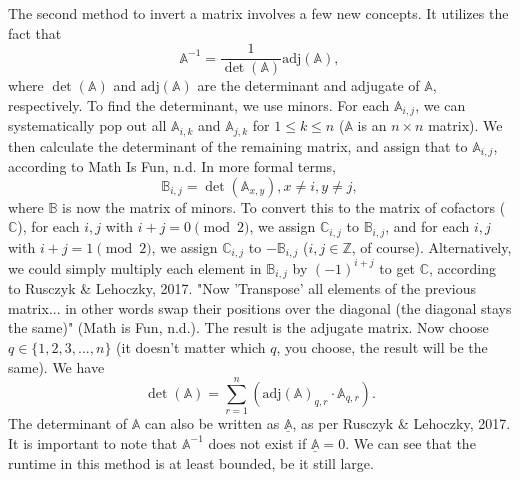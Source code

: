 \documentclass{article}
\begin{document}
\par The second method to invert a matrix involves a few new concepts. It utilizes the fact that 
$$\mathbb{A}^{-1}=\frac{1}{\det(\mathbb{A})}\text{adj}(\mathbb{A}),$$
where $\det(\mathbb{A})$ and $\text{adj}(\mathbb{A})$ are the determinant and adjugate of $\mathbb{A}$, respectively. To find the determinant, we use minors. For each $\mathbb{A}_{i,j}$, we can systematically pop out all $\mathbb{A}_{i,k}$ and $\mathbb{A}_{j,k}$ for $1\le k\le n$ ($\mathbb{A}$ is an $n\times n$ matrix). We then calculate the determinant  of the remaining matrix, and assign that to $\mathbb{A}_{i,j}$, according to Math Is Fun, n.d. In more formal terms,
$$\mathbb{B}_{i,j}=\det(\mathbb{A}_{x,y}), x\ne i, y\ne j,$$
where $\mathbb{B}$ is now the matrix of minors. To convert this to the matrix of cofactors ($\mathbb{C}$), for each $i,j$ with $i+j=0\pmod{2}$, we assign $\mathbb{C}_{i,j}$ to $\mathbb{B}_{i,j}$, and for each $i,j$ with $i+j=1\pmod{2}$, we assign $\mathbb{C}_{i,j}$ to $-\mathbb{B}_{i,j}$ ($i,j\in\mathbb{Z}$, of course). Alternatively, we could simply multiply each element in $\mathbb{B}_{i,j}$ by $(-1)^{i+j}$ to get $\mathbb{C}$, according to Rusczyk \& Lehoczky, 2017. "Now 'Transpose' all elements of the previous matrix... in other words swap their positions over the diagonal (the diagonal stays the same)" (Math is Fun, n.d.). The result is the adjugate matrix. Now choose $q\in\{1,2,3,...,n\}$ (it doesn't matter which $q$, you choose, the result will be the same). We have
$$\det(\mathbb{A})=\sum_{r=1}^{n}\left(\text{adj}(\mathbb{A})_{q,r}\cdot \mathbb{A}_{q,r}\right).$$
The determinant of $\mathbb{A}$ can also be written as $\underline{\mathbb{A}}$, as per Rusczyk \& Lehoczky, 2017. It is important to note that $\mathbb{A}^{-1}$ does not exist if $\underline{\mathbb{A}}=0$. We can see that the runtime in this method is at least bounded, be it still large.
\end{document}
